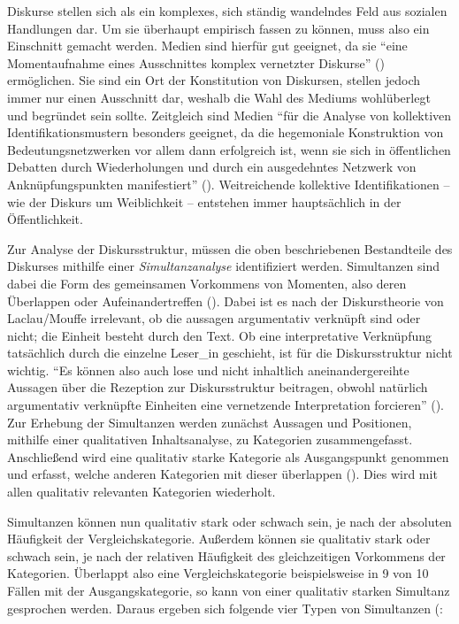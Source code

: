 \documentclass[12pt, titlepage=true, toc=bib]{scrartcl}
\begin{document}
Diskurse stellen sich als ein komplexes, sich ständig wandelndes Feld aus sozialen Handlungen dar. Um sie überhaupt empirisch fassen zu können, muss also ein Einschnitt gemacht werden. Medien sind hierfür gut geeignet, da sie "`eine Momentaufnahme eines Ausschnittes komplex vernetzter Diskurse"' (\cite[8]{bruell_chancen_2006}) ermöglichen. Sie sind ein Ort der Konstitution von Diskursen, stellen jedoch immer nur einen Ausschnitt dar, weshalb die Wahl des Mediums wohlüberlegt und begründet sein sollte. Zeitgleich sind Medien "`für die Analyse von kollektiven Identifikationsmustern besonders geeignet, da die hegemoniale Konstruktion von Bedeutungsnetzwerken vor allem dann erfolgreich ist, wenn sie sich in öffentlichen Debatten durch Wiederholungen und durch ein ausgedehntes Netzwerk von Anknüpfungspunkten manifestiert"' (\cite[202]{nonhoff_kollektive_2007}). Weitreichende kollektive Identifikationen -- wie der Diskurs um Weiblichkeit -- entstehen immer hauptsächlich in der Öffentlichkeit. 

Zur Analyse der Diskursstruktur, müssen die oben beschriebenen Bestandteile des Diskurses mithilfe einer \textit{Simultanzanalyse} identifiziert werden. Simultanzen sind dabei die Form des gemeinsamen Vorkommens von Momenten, also deren Überlappen oder Aufeinandertreffen (\cite[11][vgl.]{bruell_chancen_2006}). Dabei ist es nach der Diskurstheorie von Laclau/Mouffe irrelevant, ob die aussagen argumentativ verknüpft sind oder nicht; die Einheit besteht durch den Text. Ob eine interpretative Verknüpfung tatsächlich durch die einzelne Leser\_in geschieht, ist für die Diskursstruktur nicht wichtig. "`Es können also auch lose und nicht inhaltlich aneinandergereihte Aussagen über die Rezeption zur Diskursstruktur beitragen, obwohl natürlich argumentativ verknüpfte Einheiten eine vernetzende Interpretation forcieren"' (\cite[9]{bruell_chancen_2006}). Zur Erhebung der Simultanzen werden zunächst Aussagen und Positionen, mithilfe einer qualitativen Inhaltsanalyse, zu Kategorien zusammengefasst. Anschließend wird eine qualitativ starke Kategorie als Ausgangspunkt genommen und erfasst, welche anderen Kategorien mit dieser überlappen (\cite[vgl.][205]{nonhoff_kollektive_2007}). Dies wird mit allen qualitativ relevanten Kategorien wiederholt.

Simultanzen können nun qualitativ stark oder schwach sein, je nach der absoluten Häufigkeit der Vergleichskategorie. Außerdem können sie qualitativ stark oder schwach sein, je nach der relativen Häufigkeit des gleichzeitigen Vorkommens der Kategorien. Überlappt also eine Vergleichskategorie beispielsweise in 9 von 10 Fällen mit der Ausgangskategorie, so kann von einer qualitativ starken Simultanz gesprochen werden. Daraus ergeben sich folgende vier Typen von Simultanzen (\cite[vgl.][12]{bruell_chancen_2006}:
\end{document}
